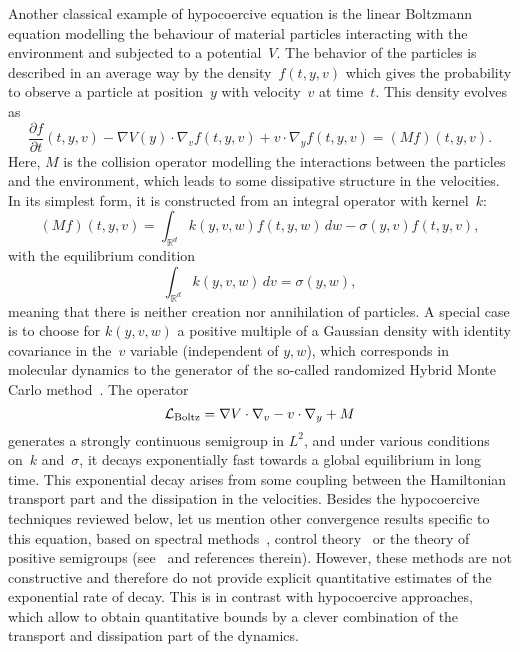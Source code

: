 \documentclass{article}
\newcommand{\cL}{\mathcal{L}}
\newcommand{\R}{\mathbb{R}}
\begin{document}
Another classical example of hypocoercive equation is the linear Boltzmann equation modelling the behaviour of material particles interacting with the environment and subjected to a potential~$V$. The behavior of the particles is described in an average way by the density~$f(t,y,v)$ which gives the probability to observe a particle at position~$y$ with velocity~$v$ at time~$t$. This density evolves as
\begin{equation}
  \label{eq:Boltzmann_eq}
  \frac{\partial f}{\partial t}(t,y,v) - \nabla V(y) \cdot \nabla_v f(t,y,v) + v\cdot\nabla_y f(t,y,v) = (M f)(t,y,v).
\end{equation}
Here, $M$ is the collision operator modelling the interactions between the particles and the environment, which leads to some dissipative structure in the velocities. In its simplest form, it is constructed from an integral operator with kernel~$k$:
$$
(M f)(t,y,v) = \int_{\R^d}k(y,v,w)f(t,y,w) \, dw -\sigma (y,v)f(t,y,v),
$$
with the equilibrium condition
\[
\int_{\R^d}k(y,v,w)\, dv = \sigma (y,w),
\]
meaning that there is neither creation nor annihilation of particles.
A special case is to choose for $k(y,v,w)$ a positive multiple of a
Gaussian density with identity covariance in the~$v$ variable
(independent of $y,w$), which corresponds in molecular dynamics to the
generator of the so-called randomized Hybrid Monte Carlo
method~\cite{BRSS17}. The operator
\[
  \cL_{\rm Boltz} = \nabla V\cdot \nabla_v-v\cdot\nabla_y + M
\] 
generates a strongly continuous semigroup in $L^{2}$, and under various conditions on~$k$ and~$\sigma$, it decays exponentially fast towards a global equilibrium in long time. This exponential decay arises from some coupling between the Hamiltonian transport part and the dissipation in the velocities. Besides the hypocoercive techniques reviewed below, let us mention other convergence results specific to this equation, based on spectral methods~\cite{Ukai74, Vidav70}, control theory~\cite{HKL15} or the theory of positive semigroups (see~\cite{BS13,Mokhtar14} and references therein). However, these methods are not constructive and therefore do not provide explicit quantitative estimates of the exponential rate of decay. This is in contrast with hypocoercive approaches, which allow to obtain quantitative bounds by a clever combination of the transport and dissipation part of the dynamics. 
\end{document}
